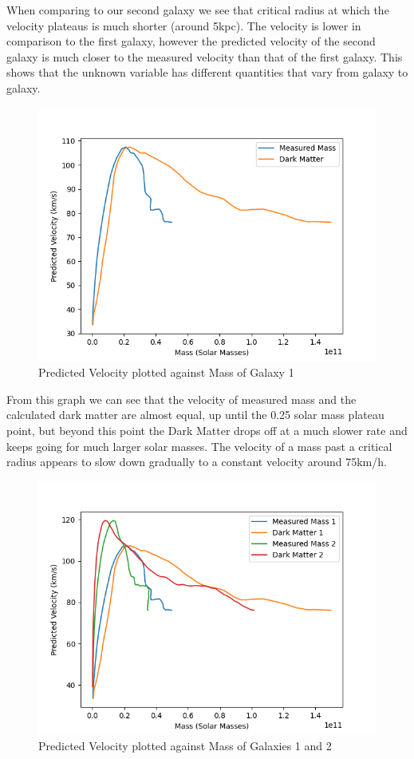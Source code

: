 \documentclass[10pt, twocolumn, twoside]{article}
\begin{document}
When comparing to our second galaxy we see that critical radius at which the velocity plateaus is much shorter (around 5kpc). The velocity is lower in comparison to the first galaxy, however the predicted velocity of the second galaxy is much closer to the measured velocity than that of the first galaxy. This shows that the unknown variable has different quantities that vary from galaxy to galaxy.

\newpage

\begin{figure}[ht]
\includegraphics[width=\columnwidth]{graph2.png}
\caption[width=\columnwidth]{Predicted Velocity plotted against Mass of Galaxy 1}
\end{figure}

From this graph we can see that the velocity of measured mass and the calculated dark matter are almost equal, up until the 0.25 solar mass plateau point, but beyond this point the Dark Matter drops off at a much slower rate and keeps going for much larger solar masses. The velocity of a mass past a critical radius appears to slow down gradually to a constant velocity around 75km/h.

\begin{figure}[ht]
\includegraphics[width=\columnwidth]{graph7.png}
\caption[width=\columnwidth]{Predicted Velocity plotted against Mass of Galaxies 1 and 2}
\end{figure}
\end{document}
